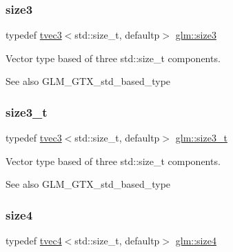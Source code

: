 \subsubsection{\texorpdfstring{size3}{size3}}
{\footnotesize\ttfamily typedef \hyperlink{structglm_1_1tvec3}{tvec3}$<$std\+::size\+\_\+t, defaultp$>$ \hyperlink{group__gtx__std__based__type_gacf3e47fc09ad812f100e13442919fc79}{glm\+::size3}}

Vector type based of three std\+::size\+\_\+t components. \begin{DoxySeeAlso}{See also}
G\+L\+M\+\_\+\+G\+T\+X\+\_\+std\+\_\+based\+\_\+type 
\end{DoxySeeAlso}
\mbox{\label{group__gtx__std__based__type_ga689991bc66c16637f043ade5cbb87260}} 
\subsubsection{\texorpdfstring{size3\+\_\+t}{size3\_t}}
{\footnotesize\ttfamily typedef \hyperlink{structglm_1_1tvec3}{tvec3}$<$std\+::size\+\_\+t, defaultp$>$ \hyperlink{group__gtx__std__based__type_ga689991bc66c16637f043ade5cbb87260}{glm\+::size3\+\_\+t}}

Vector type based of three std\+::size\+\_\+t components. \begin{DoxySeeAlso}{See also}
G\+L\+M\+\_\+\+G\+T\+X\+\_\+std\+\_\+based\+\_\+type 
\end{DoxySeeAlso}
\mbox{\label{group__gtx__std__based__type_ga66a39603f01a37444de3adb28c021e79}} 
\subsubsection{\texorpdfstring{size4}{size4}}
{\footnotesize\ttfamily typedef \hyperlink{structglm_1_1tvec4}{tvec4}$<$std\+::size\+\_\+t, defaultp$>$ \hyperlink{group__gtx__std__based__type_ga66a39603f01a37444de3adb28c021e79}{glm\+::size4}}

